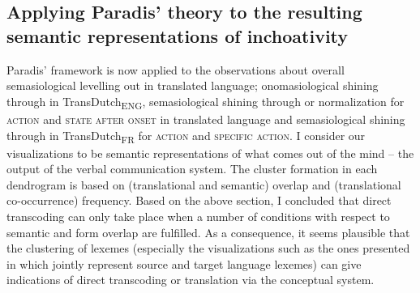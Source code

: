 \subsection{Applying Paradis’ theory to the resulting semantic representations of inchoativity}
\label{sec:5.3.3}  
Paradis’ framework is now applied to the observations about overall semasiological levelling out in translated language; onomasiological shining through in TransDutch\textsubscript{ENG}, semasiological shining through or normalization for \textsc{action} and \textsc{state after onset} in translated language and semasiological shining through in TransDutch\textsubscript{FR} for \textsc{action} and \textsc{specific} \textsc{action}. I consider our visualizations to be semantic representations of what comes out of the mind – the output of the verbal communication system. The cluster formation in each dendrogram is based on (translational and semantic) overlap and (translational co-occurrence) frequency. Based on the above section, I concluded that direct transcoding can only take place when a number of conditions with respect to semantic and form overlap are fulfilled. As a consequence, it seems plausible that the clustering of lexemes (especially the visualizations such as the ones presented in  which jointly represent source and target language lexemes) can give indications of direct transcoding or translation via the conceptual system.

